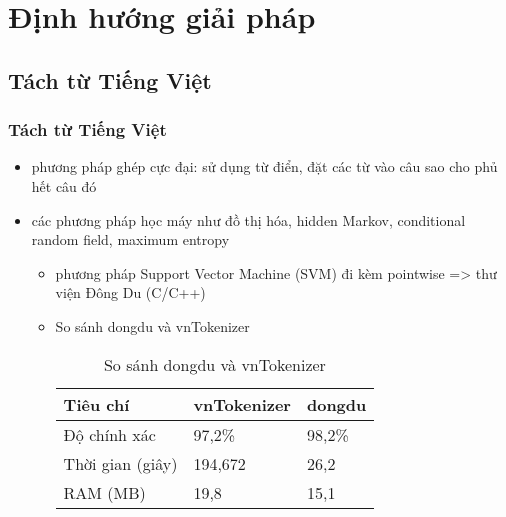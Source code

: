 
\section{Định hướng giải pháp}

\subsection{Tách từ Tiếng Việt}

\begin{frame}
  \frametitle{Tách từ Tiếng Việt}
  
  \begin{itemize}[<+->]
    \item phương pháp ghép cực đại: sử dụng từ điển, đặt các từ vào câu sao cho phủ hết câu đó
    \item các phương pháp học máy như đồ thị hóa, hidden Markov, conditional random field, maximum entropy
      \begin{itemize}[<+->]
        \item phương pháp Support Vector Machine (SVM) đi kèm pointwise => thư viện Đông Du (C/C++)
        \item So sánh dongdu và vnTokenizer
          \begin{flushleft}
            \begin{table}[p]
              \begin{tabular}{|l|l|l|}
                \hline
                Tiêu chí & vnTokenizer & dongdu \\ \hline
                Độ chính xác & 97,2\% & 98,2\% \\ \hline
                Thời gian (giây) & 194,672 & 26,2 \\ \hline
                RAM (MB) & 19,8 & 15,1 \\ \hline
              \end{tabular}
              \caption{So sánh dongdu và vnTokenizer}
            \end{table}
          \end{flushleft}
      \end{itemize}
  \end{itemize}
  
\end{frame}


